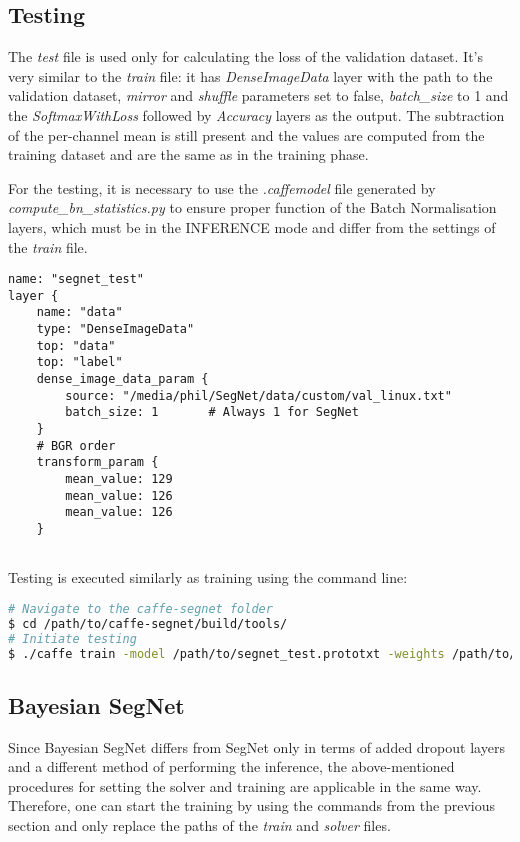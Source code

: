 \subsection{Testing}

The \textit{test} file is used only for calculating the loss of the validation dataset. It's very similar to the \textit{train} file: it has \textit{DenseImageData} layer with the path to the validation dataset, \textit{mirror} and \textit{shuffle} parameters set to false, \textit{batch\_size} to 1 and the \textit{SoftmaxWithLoss} followed by \textit{Accuracy} layers as the output. The subtraction of the per-channel mean is still present and the values are computed from the training dataset and are the same as in the training phase. 

For the testing, it is necessary to use the \textit{.caffemodel} file generated by \textit{compute\_bn\_statistics.py} to ensure proper function of the Batch Normalisation layers, which must be in the INFERENCE mode and differ from the settings of the \textit{train} file.

\begin{lstlisting}
name: "segnet_test"
layer {
	name: "data"
	type: "DenseImageData"
	top: "data"
	top: "label"
	dense_image_data_param {
		source: "/media/phil/SegNet/data/custom/val_linux.txt"	
		batch_size: 1		# Always 1 for SegNet
	}
	# BGR order
	transform_param {
		mean_value: 129
		mean_value: 126
		mean_value: 126 
	}  
	
\end{lstlisting}

Testing is executed similarly as training using the command line:

\begin{lstlisting}[language=bash]
# Navigate to the caffe-segnet folder
$ cd /path/to/caffe-segnet/build/tools/
# Initiate testing
$ ./caffe train -model /path/to/segnet_test.prototxt -weights /path/to/final_weights.caffemodel
\end{lstlisting}

\subsection{Bayesian SegNet}

Since Bayesian SegNet differs from SegNet only in terms of added dropout layers and a different method of performing the inference, the above-mentioned procedures for setting the solver and training are applicable in the same way. Therefore, one can start the training by using the commands from the previous section and only replace the paths of the \textit{train} and \textit{solver} files. 

